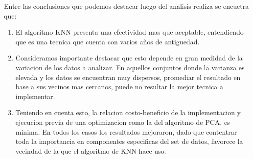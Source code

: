 
Entre las conclusiones que podemos destacar luego del analisis realiza se encuetra que:
\begin{enumerate}
 \item El algoritmo KNN presenta una efectividad mas que aceptable, entendiendo que es una tecnica que cuenta con varios años de antiguedad.
 \item Consideramos importante destacar que esto depende en gran medidad de la variacion de los datos a analizar. En aquellos conjuntos donde la varianza es elevada y los datos se encuentran muy dispersos, promediar el resultado en base a sus vecinos mas cercanos, puede no resultar la mejor tecnica a implementar.
 \item Teniendo en cuenta esto, la relacion costo-beneficio de la implementacion y ejecucion previa de una optimizacion como la del algoritmo de PCA, es minima. En todos los casos los resultados mejoraron, dado que contentrar toda la importancia en componentes especificas del set de datos, favorece la vecindad de la que el algoritmo de KNN hace uso.
\end{enumerate}
